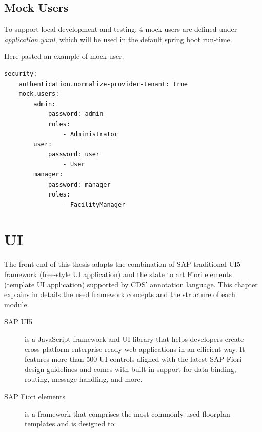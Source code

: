 \subsection{Mock Users}
To support local development and testing, 4 mock users are defined under \textit{application.yaml}, which will be used in the default spring boot run-time.

Here pasted an example of mock user.

\begin{lstlisting}[language={bash}]
security:
    authentication.normalize-provider-tenant: true
    mock.users:
        admin:
            password: admin
            roles:  
                - Administrator 
        user:
            password: user
                - User
        manager:
            password: manager
            roles:
                - FacilityManager
\end{lstlisting}

\section{UI}

The front-end of this thesis adapts the combination of SAP traditional UI5 framework (free-style UI application) and the state to art Fiori elements (template UI application) supported by CDS' annotation language.  This chapter explains in details the used framework concepts and the structure of each module.

\begin{description}
	\item[SAP UI5] is a JavaScript framework and UI library that helps developers create cross-platform enterprise-ready web applications in an efficient way. It features more than 500 UI controls aligned with the latest SAP Fiori design guidelines and comes with built-in support for data binding, routing, message handling, and more. \cite{fiorielements}
 
	\item[SAP Fiori elements] is a framework that comprises the most commonly used floorplan templates and is designed to:
\end{description}

